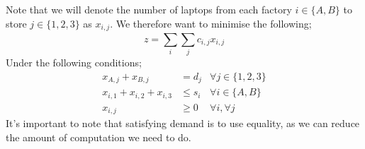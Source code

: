 \documentclass[a4paper, 12pt]{article}
\newcommand{\summation}[2]{\sum\limits_{#1}^{#2}}
\begin{document}
\begin{enumerate}[1.]
\begin{enumerate}[1.]
                                Note that we will denote the number of laptops from each factory $i \in \{A, B\}$ to store $j \in \{1, 2, 3\}$ as $x_{i, j}$.
                                We therefore want to minimise the following;
                                $$z = \summation{i}{} \summation{j}{} c_{i, j}x_{i, j}$$
                                Under the following conditions;
                                \begin{align*}
                                    x_{A, j} + x_{B, j} & = d_j & \forall j \in \{1, 2, 3\} \\
                                    x_{i, 1} + x_{i, 2} + x_{i, 3} & \leq s_i & \forall i \in \{A, B\} \\
                                    x_{i, j} & \geq 0 & \forall i, \forall j
                                \end{align*}
                                It's important to note that satisfying demand is to use equality, as we can reduce the amount of computation we need to do.
                        \end{enumerate}
                \end{enumerate}
\end{document}
